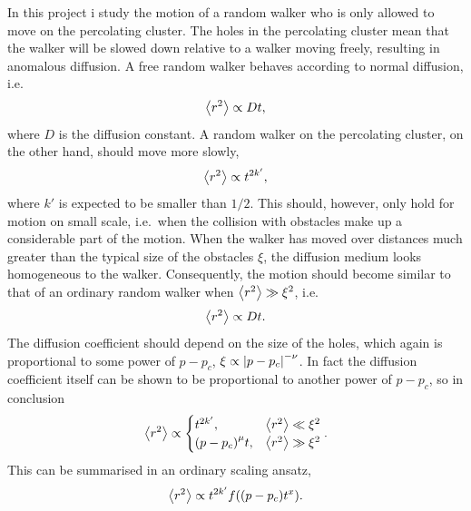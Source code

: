 \documentclass[11pt,british,a4paper]{report}
\begin{document}
In this project i study the motion of a random walker who is only allowed to move on the percolating cluster. The holes in the percolating cluster mean that the walker will be slowed down relative to a walker moving freely, resulting in anomalous diffusion. A free random walker behaves according to normal diffusion, i.e.
\[
    \ev{r^2} \propto Dt,
\]
where \(D\) is the diffusion constant. A random walker on the percolating cluster, on the other hand, should move more slowly,
\[
    \ev{r^2} \propto t^{2k'},
\]
where \(k'\) is expected to be smaller than \(1/2\). This should, however, only hold for motion on small scale, i.e.\ when the collision with obstacles make up a considerable part of the motion. When the walker has moved over distances much greater than the typical size of the obstacles \(\xi\), the diffusion medium looks homogeneous to the walker. Consequently, the motion should become similar to that of an ordinary random walker when \(\ev{r^2}\gg \xi^2\), i.e.
\[
    \ev{r^2} \propto Dt.
\]
The diffusion coefficient should depend on the size of the holes, which again is proportional to some power of \(p-p_c\), \(\xi \propto \abs{p-p_c}^{-\nu}\). In fact the diffusion coefficient itself can be shown to be proportional to another power of \(p-p_c\), so in conclusion
\[
    \ev{r^2} \propto \begin{cases}
                        t^{2k'}, & \ev{r^2} \ll \xi^2 \\
                        \qty(p-p_c)^\mu t, & \ev{r^2} \gg \xi^2
                     \end{cases}.
\]
This can be summarised in an ordinary scaling ansatz,
\[
    \ev{r^2} \propto t^{2k'} f\qty(\qty(p-p_c)t^x).
\]



\nocite{*}
\printbibliography{}
\end{document}
